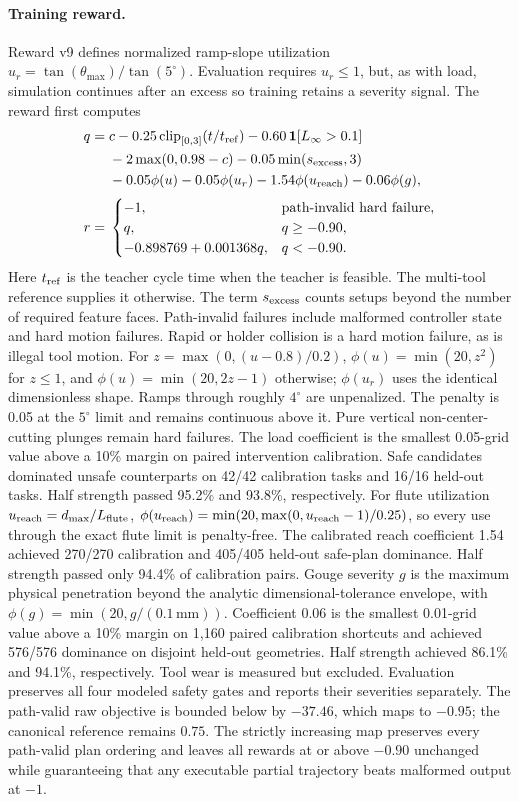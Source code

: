\documentclass{article}
\begin{document}
\paragraph{Training reward.}
Reward v9 defines normalized ramp-slope utilization
$u_r=\tan(\theta_{\max})/\tan(5^\circ)$.  Evaluation requires $u_r\leq1$,
but, as with load, simulation continues after an excess so training retains
a severity signal.  The reward first computes
\[
\begin{aligned}
q={}&c-0.25\,\mathrm{clip}_{[0,3]}(t/t_{\rm ref})
       -0.60\,\mathbf 1[L_\infty>0.1]\\
    &-2\max(0,0.98-c)-0.05\min(s_{\rm excess},3)\\
    &-0.05\phi(u)-0.05\phi(u_r)-1.54\phi(u_{\rm reach})
     -0.06\phi(g),\\[2pt]
r={}&\begin{cases}
-1,&\text{path-invalid hard failure},\\
q,&q\geq-0.90,\\
-0.898769+0.001368q,&q<-0.90.
\end{cases}
\end{aligned}
\]
Here $t_{\rm ref}$ is the teacher cycle time when the teacher is
feasible.  The multi-tool reference supplies it otherwise.
The term $s_{\rm excess}$ counts setups beyond the number of required
feature faces.  Path-invalid failures include malformed controller
state and hard motion failures.  Rapid or holder collision is a hard
motion failure, as is illegal tool motion.
For $z=\max(0,(u-0.8)/0.2)$,
$\phi(u)=\min(20,z^2)$ for $z\leq1$, and
$\phi(u)=\min(20,2z-1)$ otherwise; $\phi(u_r)$ uses the identical
dimensionless shape.  Ramps through roughly $4^\circ$ are unpenalized.
The penalty is 0.05 at the $5^\circ$ limit and remains continuous above
it.  Pure vertical non-center-cutting plunges remain hard failures.  The
load coefficient is the smallest 0.05-grid value above a 10\% margin on
paired intervention calibration.  Safe candidates dominated unsafe
counterparts on 42/42 calibration tasks and 16/16 held-out tasks.  Half
strength passed 95.2\% and 93.8\%, respectively.
For flute utilization $u_{\rm reach}=d_{\max}/L_{\rm flute}$,
$\phi(u_{\rm reach})=\min(20,\max(0,u_{\rm reach}-1)/0.25)$, so every
use through the exact flute limit is penalty-free.  The calibrated reach
coefficient 1.54 achieved 270/270 calibration and 405/405 held-out
safe-plan dominance.  Half strength passed only 94.4\% of calibration pairs.
Gouge severity $g$ is the maximum physical penetration beyond the analytic
dimensional-tolerance envelope, with
$\phi(g)=\min(20,g/(0.1\,\mathrm{mm}))$. Coefficient 0.06 is the smallest
0.01-grid value above a 10\% margin on 1,160 paired calibration shortcuts
and achieved 576/576 dominance on disjoint held-out geometries.  Half
strength achieved 86.1\% and 94.1\%, respectively.
Tool wear is measured but excluded.  Evaluation preserves all four
modeled safety gates and reports their severities separately.
The path-valid raw objective is bounded below by $-37.46$, which maps to
$-0.95$; the canonical reference
remains $0.75$.  The strictly increasing map preserves every path-valid plan
ordering and leaves all rewards at or above $-0.90$ unchanged while
guaranteeing that any executable partial trajectory beats malformed output
at $-1$.
\end{document}
